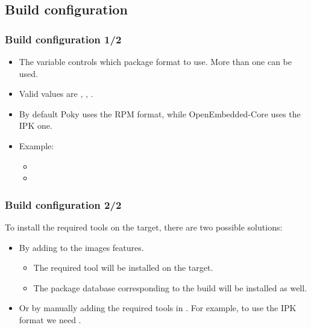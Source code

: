 \subsection{Build configuration}

\begin{frame}
  \frametitle{Build configuration 1/2}
  \begin{itemize}
    \item The  variable controls which package
      format to use. More than one can be used.
    \item Valid values are , ,
      .
    \item By default Poky uses the RPM format, while OpenEmbedded-Core
      uses the IPK one.
    \item Example:
      \begin{itemize}
        \item {}
        \item {}
      \end{itemize}
  \end{itemize}
\end{frame}

\begin{frame}
  \frametitle{Build configuration 2/2}
  To install the required tools on the target, there are two
  possible solutions:
  \begin{itemize}
    \item By adding  to the images
      features.
      \begin{itemize}
        \item The required tool will be installed on the target.
        \item The package database corresponding to the build will be
          installed as well.
      \end{itemize}
    \item Or by manually adding the required tools in
      . For example, to use the IPK format we
      need .
  \end{itemize}
\end{frame}

